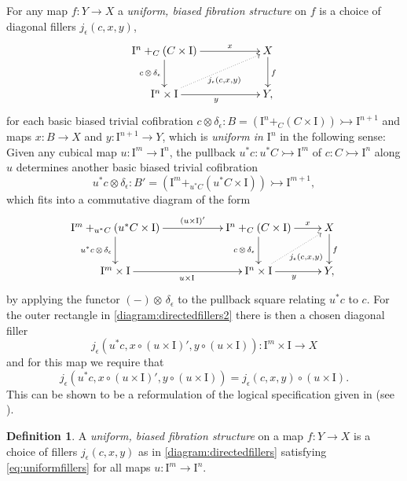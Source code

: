 \documentclass[12pt]{article}
\newcommand{\mono}{\ensuremath{\rightarrowtail}}
\newcommand{\ra}{\ensuremath{\rightarrow}}
\newcommand{\I}{\ensuremath{\mathrm{I}}}
\newtheorem{corollary}[theorem]{Corollary}
\theoremstyle{remark}
\theoremstyle{definition}
\newtheorem{definition}[theorem]{Definition}
\begin{document}
For any map $f:Y\ra X$  a \emph{uniform, biased fibration structure} on $f$ is a choice of diagonal fillers $j_\epsilon(c,x,y)$,
\begin{equation}\label{diagram:directedfillers}
\xymatrix{
\I^n +_C (C\times\I) \ar[d]_{c\,\otimes\,\delta_\epsilon} \ar[rr]^-{x} && X \ar[d]^f \\
\I^{n}\times \I \ar@{.>}[rru]_{j_\epsilon(c,x,y)} \ar[rr]_y && Y,
}
\end{equation}
for each basic biased trivial cofibration $c \otimes \delta_\epsilon : B = (\I^n +_C (C\times\I)) \mono \I^{n+1}$ and maps $x : B\ra X$ and $y : \I^{n+1}\ra Y$, which is \emph{uniform in $\I^{n}$} in the following sense: Given any cubical map $u : \I^m \ra \I^n$, the pullback $u^*c : u^*C\mono \I^m$ of $c : C\mono \I^n$ along $u$ determines another basic biased trivial cofibration $$u^*c \otimes \delta_\epsilon : B' = (\I^m +_{u^*C} (u^*C\times\I)) \mono \I^{m+1},$$ which fits into a commutative diagram of the form
\begin{equation}\label{diagram:directedfillers2}
\xymatrix{
\I^m +_{u^*C} (u^*C\times\I) \ar[d]_{u^*c\,\otimes\,\delta_\epsilon} \ar[rr]^-{(u\times\I)'} && \I^n +_C (C\times\I) \ar[d]_{c\,\otimes\,\delta_\epsilon} \ar[r]^-{x} & X \ar[d]^f \\
\I^{m}\times \I  \ar[rr]_{u\times \I} && \I^{n}\times \I \ar@{.>}[ru]_{j_\epsilon(c,x,y)} \ar[r]_{y} & Y,
}
\end{equation}
by applying the functor $(-)\otimes\,\delta_\epsilon$ to the pullback square relating $u^*c$ to $c$.  For the outer rectangle in \eqref{diagram:directedfillers2} there is then a chosen diagonal filler $$j_\epsilon(u^*c,x\circ(u\times\I)', y\circ(u\times\I)): \I^m\times\I\ra X$$ and for this map we require that
\begin{equation}\label{eq:uniformfillers}
j_\epsilon(u^*c,x\circ (u\times\I)', y\circ(u\times\I)) = j_\epsilon(c,x,y)\circ(u\times \I).
\end{equation}
This can be shown to be a reformulation of the logical specification given in \cite{CCHM} (see \cite{AGH}).

\begin{definition}\label{def:uniform} A \emph{uniform, biased fibration structure} on a map $f: Y\ra X$ is a choice of fillers $j_\epsilon(c,x,y)$ as in \eqref{diagram:directedfillers} satisfying \eqref{eq:uniformfillers} for all maps $u : \I^m\ra\I^n$.
\end{definition}

\end{document}
